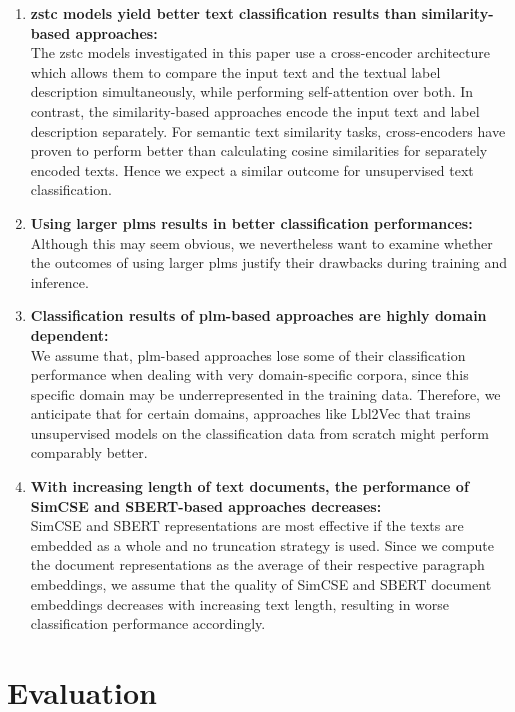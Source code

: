 \documentclass[sigconf]{acmart}
\begin{document}
\begin{enumerate}
    \item \textbf{\ac{zstc} models yield better text classification results than similarity-based approaches:} \\
    The \ac{zstc} models investigated in this paper use a cross-encoder architecture which allows them to compare the input text and the textual label description simultaneously, while performing self-attention over both. In contrast, the similarity-based approaches encode the input text and label description separately. For semantic text similarity tasks, cross-encoders have proven to perform better than calculating cosine similarities for separately encoded texts. Hence we expect a similar outcome for unsupervised text classification.
    \item \textbf{Using larger \acp{plm} results in better classification performances:} \\
    Although this may seem obvious, we nevertheless want to examine whether the outcomes of using larger \acp{plm} justify their drawbacks during training and inference. 
    \item \textbf{Classification results of \ac{plm}-based approaches are highly domain dependent:} \\
    We assume that, \ac{plm}-based approaches lose some of their classification performance when dealing with very domain-specific corpora, since this specific domain may be underrepresented in the training data. Therefore, we anticipate that for certain domains, approaches like Lbl2Vec that trains unsupervised models on the classification data from scratch might perform comparably better. 
    \item \textbf{With increasing length of text documents, the performance of SimCSE and SBERT-based approaches decreases:} \\
    SimCSE and SBERT representations are most effective if the texts are embedded as a whole and no truncation strategy is used. Since we compute the document representations as the average of their respective paragraph embeddings, we assume that the quality of SimCSE and SBERT document embeddings decreases with increasing text length, resulting in worse classification performance accordingly. 
\end{enumerate}



\section{Evaluation}\label{sec:evaluation}
\end{document}

